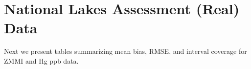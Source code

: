 \documentclass[]{elsarticle} %
\begin{document}
\begin{table}[ht]
\centering
{}
\caption{Sampling-analysis combination (Approach), population layout (Layout), response type (Response), proportion of dependent random error (DRE\%), sample size (n), mean bias (MB), root-mean-squared error (rMS(P)E), and 95\% interval coverage (Coverage) in simulation scenario 36.} 
\end{table}

\hypertarget{sec:datatabs}{%
\section{National Lakes Assessment (Real) Data}\label{sec:datatabs}}

Next we present tables summarizing mean bias, RMSE, and interval
coverage for ZMMI and Hg ppb data.
\end{document}
